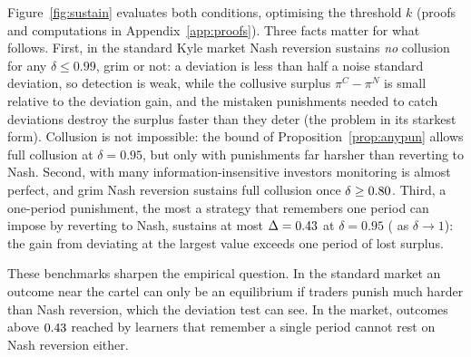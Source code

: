 Figure~\ref{fig:sustain} evaluates both conditions, optimising the threshold
$k$ (proofs and computations in Appendix~\ref{app:proofs}). Three facts
matter for what follows. First, in the standard Kyle market Nash reversion
sustains \emph{no} collusion for any $\delta\le0.99$, grim or not: a
deviation is less than half a noise standard deviation, so detection is weak,
while the collusive surplus $\pi^C-\pi^N$ is small relative to the deviation
gain, and the mistaken punishments needed to catch deviations destroy the
surplus faster than they deter (the \citet{green1984} problem in its
starkest form). Collusion is not impossible: the bound of
Proposition~\ref{prop:anypun} allows full collusion at $\delta=0.95$, but only
with punishments far harsher than reverting to Nash. Second, with many
information-insensitive investors monitoring is almost perfect, and grim
Nash reversion sustains full collusion once $\delta\ge0.80$.
Third, a one-period punishment, the most a strategy that remembers one period
can impose by reverting to Nash, sustains at most $\Delta=0.43$ at
$\delta=0.95$ (\SusDouTOneMax{} as $\delta\to1$): the gain from deviating at
the largest value exceeds one period of lost surplus.

These benchmarks sharpen the empirical question. In the standard market an
outcome near the cartel can only be an equilibrium if traders punish much
harder than Nash reversion, which the deviation test can see. In the
\citet{dou2025} market, outcomes above $0.43$ reached by learners that
remember a single period cannot rest on Nash reversion either.
